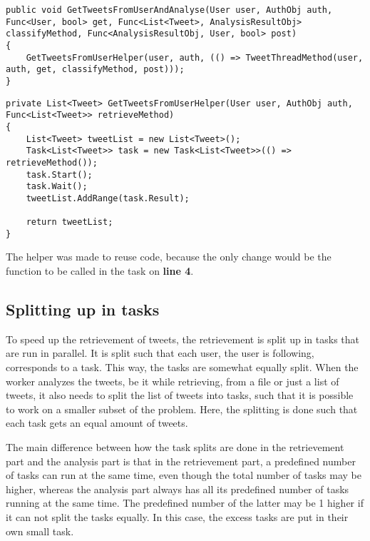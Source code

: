 \begin{minipage}[H]{\linewidth}
\begin{lstlisting}[caption = Current method call to speed up execution , label =
NewUserTweet ] 
public void GetTweetsFromUserAndAnalyse(User user, AuthObj auth, Func<User, bool> get, Func<List<Tweet>, AnalysisResultObj> classifyMethod, Func<AnalysisResultObj, User, bool> post)
{
    GetTweetsFromUserHelper(user, auth, (() => TweetThreadMethod(user, auth, get, classifyMethod, post)));
}
\end{lstlisting}
\end{minipage}

\begin{minipage}[H]{\linewidth}
\begin{lstlisting}[caption = The GetTweetsFromUserHelper, label =
UserTweetHelper]
private List<Tweet> GetTweetsFromUserHelper(User user, AuthObj auth, Func<List<Tweet>> retrieveMethod)
{
    List<Tweet> tweetList = new List<Tweet>();
    Task<List<Tweet>> task = new Task<List<Tweet>>(() => retrieveMethod());
    task.Start();
    task.Wait();
    tweetList.AddRange(task.Result);

    return tweetList;
}
\end{lstlisting}
\end{minipage}

The helper was made to reuse code, because the only change would be the function to be
called in the task on \textbf{line 4}.\\

\subsection{Splitting up in tasks}
To speed up the retrievement of tweets, the retrievement is split up in tasks
that are run in parallel. It is split such that each user, the user is following, corresponds
to a task. This way, the tasks are somewhat equally split. 
When the worker analyzes the tweets, be it while retrieving, from a file or
just a list of tweets, it also needs to split the list of tweets into tasks,
such that it is possible to work on a smaller subset of the problem. Here, the splitting is done such that each task gets an equal amount of
tweets.

The main difference between how the task splits are done in the retrievement
part and the analysis part is that in the retrievement part, a predefined number
of tasks can run at the same time, even though the total number of tasks may be
higher, whereas the analysis part always has all its predefined number of tasks
running at the same time. The predefined number of the latter may be 1 higher if
it can not split the tasks equally. In this case, the excess tasks are
put in their own small task. 

